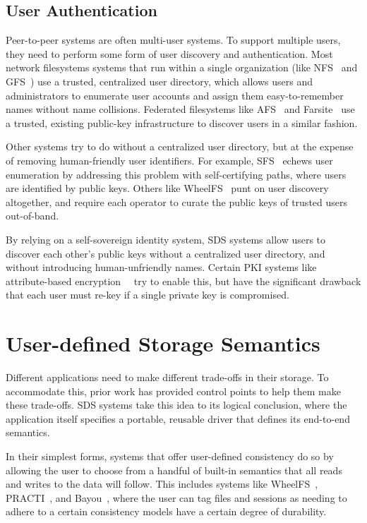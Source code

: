\subsection{User Authentication}

Peer-to-peer systems are often multi-user systems.  To support multiple users,
they need to perform some form of user discovery and authentication.
Most network filesystems systems that run within a single organization (like
NFS~\cite{nfs} and GFS~\cite{gfs}) use a trusted, centralized user directory,
which allows users and administrators to enumerate user accounts and assign them
easy-to-remember names without name collisions.
Federated filesystems like AFS~\cite{afs} and Farsite~\cite{farsite} use a
trusted, existing public-key infrastructure to discover users in a similar
fashion.

Other systems try to do without a centralized user directory, but at the expense
of removing human-friendly user identifiers.  For example,
SFS~\cite{sfs} echews user enumeration by addressing this problem with
self-certifying paths, where users are identified by public keys.
Others like WheelFS~\cite{wheelfs} punt on user discovery altogether, and
require each operator to curate the public keys of trusted users out-of-band.

By relying on a self-sovereign identity system, SDS systems allow users to
discover each other's public keys without a centralized user directory, and
without introducing human-unfriendly names.  Certain PKI systems like
attribute-based encryption~\cite{ibe-shamir}~\cite{ibe-weil} try to enable this, but have the significant
drawback that each user must re-key if a single private key is compromised.

\section{User-defined Storage Semantics}

Different applications need to make different trade-offs in their storage.  To
accommodate this, prior work has provided
control points to help them make these trade-offs.  SDS systems take
this idea to its logical conclusion, where the application itself specifies a
portable, reusable driver that defines its end-to-end semantics.

In their simplest forms, systems that offer user-defined consistency do so by
allowing the user to choose from a handful of built-in semantics that all reads
and writes to the data will follow.  This includes systems like
WheelFS~\cite{wheelfs}, PRACTI~\cite{practi}, and
Bayou~\cite{bayou}, where the user can tag files and sessions as needing to
adhere to a certain consistency models have a certain degree of
durability.

